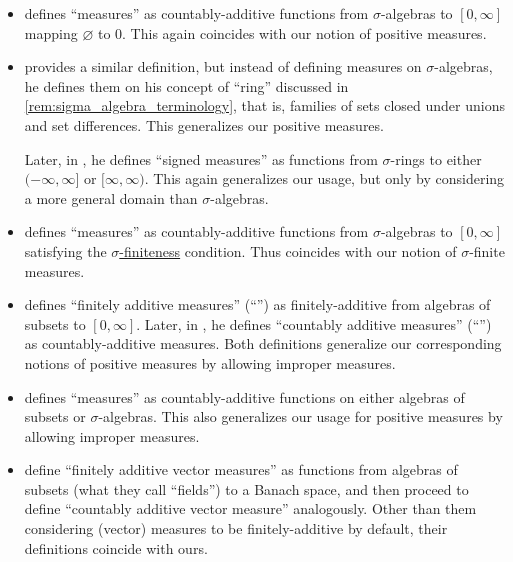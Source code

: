 \begin{remark}
\begin{itemize}
    \item \Textcite[51]{КанторовичАкилов1984ФункциональныйАнализ} defines \enquote{measures} as countably-additive functions from \( \sigma \)-algebras to \( [0, \infty] \) mapping \( \varnothing \) to \( 0 \). This again coincides with our notion of positive measures.

    \item \Textcite[30]{Halmos1976MeasureTheory} provides a similar definition, but instead of defining measures on \( \sigma \)-algebras, he defines them on his concept of \enquote{ring} discussed in \cref{rem:sigma_algebra_terminology}, that is, families of sets closed under unions and set differences. This generalizes our positive measures.

    Later, in \cite[118]{Halmos1976MeasureTheory}, he defines \enquote{signed measures} as functions from \( \sigma \)-rings to either \( (-\infty, \infty] \) or \( [\infty, \infty) \). This again generalizes our usage, but only by considering a more general domain than \( \sigma \)-algebras.

    \item \Textcite[13]{Malliavin1995IntegrationAndProbability} defines \enquote{measures} as countably-additive functions from \( \sigma \)-algebras to \( [0, \infty] \) satisfying the \hyperref[def:sigma_finite_measure]{\( \sigma \)-finiteness} condition. Thus coincides with our notion of \( \sigma \)-finite measures.

    \item \Textcite[def. I.1.2]{Ширяев2007ВероятностьТом1} defines \enquote{finitely additive measures} (\enquote{}) as finitely-additive from algebras of subsets to \( [0, \infty] \). Later, in \cite[def. I.1.6]{Ширяев2007ВероятностьТом1}, he defines \enquote{countably additive measures} (\enquote{}) as countably-additive measures. Both definitions generalize our corresponding notions of positive measures by allowing improper measures.

    \item \Textcite[3]{Bobrowski2005FunctionalAnalysis} defines \enquote{measures} as countably-additive functions on either algebras of subsets or \( \sigma \)-algebras. This also generalizes our usage for positive measures by allowing improper measures.

    \item \Textcite[1]{DiestelUhl1977VectorMeasures} define \enquote{finitely additive vector measures} as functions from algebras of subsets (what they call \enquote{fields}) to a Banach space, and then proceed to define \enquote{countably additive vector measure} analogously. Other than them considering (vector) measures to be finitely-additive by default, their definitions coincide with ours.


\end{itemize}
\end{remark}
